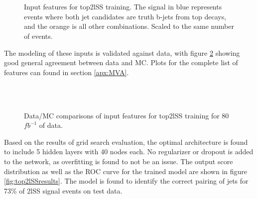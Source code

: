 \begin{figure}[h!]
    \\
    \\
    \caption{Input features for top2lSS training. The signal in blue represents events where both jet candidates are truth b-jets from top decays, and the orange is all other combinations. Scaled to the same number of events.}
    \label{fig:features_top2lSS}                                                                                        
\end{figure}

The modeling of these inputs is validated against data, with figure \ref{fig:model_top2lSS} showing good general agreement between data and MC. Plots for the complete list of features can found in section \ref{apx:MVA}.

\begin{figure}[h!]
    \\
    \\
    \caption{Data/MC comparisons of input features for top2lSS training for 80 $fb^{-1}$ of data.}
    \label{fig:model_top2lSS}
\end{figure}

Based on the results of grid search evaluation, the optimal architecture is found to include 5 hidden layers with 40 nodes each. No regularizer or dropout is added to the network, as overfitting is found to not be an issue. The output score distribution as well as the ROC curve for the trained model are shown in figure \ref{fig:top2lSSresults}. The model is found to identify the correct pairing of jets for 73\% of 2lSS signal events on test data.

